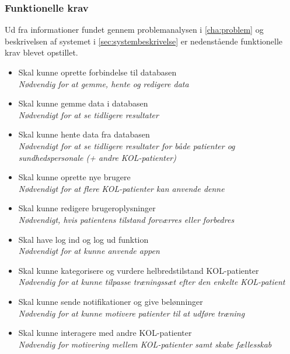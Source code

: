 \subsubsection{Funktionelle krav}
Ud fra informationer fundet gennem problemanalysen i \autoref{cha:problem} og beskrivelsen af systemet i \autoref{sec:systembeskrivelse} er nedenstående funktionelle krav blevet opstillet. 
  
\begin{itemize}
\item Skal kunne oprette forbindelse til databasen
	\\
	\textit{Nødvendig for at gemme, hente og redigere data}

\item Skal kunne gemme data i databasen
	\\
	\textit{Nødvendigt for at se tidligere resultater}

\item Skal kunne hente data fra databasen
	\\
	\textit{Nødvendigt for at se tidligere resultater for både patienter og sundhedspersonale (+ andre KOL-patienter)}	
	
\item Skal kunne oprette nye brugere 
	\\
	\textit{Nødvendigt for at flere KOL-patienter kan anvende denne}

\item Skal kunne redigere brugeroplysninger
	\\
	\textit{Nødvendigt, hvis patientens tilstand forværres eller forbedres}

\item Skal have log ind og log ud funktion
	\\
	\textit{Nødvendigt for at kunne anvende appen}

\item Skal kunne kategorisere og vurdere helbredstilstand KOL-patienter
	\\
	\textit{Nødvendig for at kunne tilpasse træningssæt efter den enkelte KOL-patient}

\item Skal kunne sende notifikationer og give belønninger 
	\\
	\textit{Nødvendig for at kunne motivere patienter til at udføre træning}

\item Skal kunne interagere med andre KOL-patienter
	\\
	\textit{Nødvendig for motivering mellem KOL-patienter samt skabe fællesskab}

\end{itemize}

